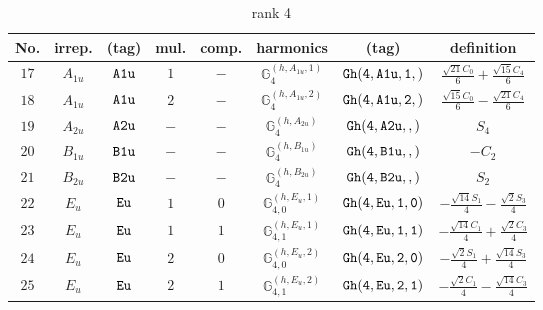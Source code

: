 \documentclass[fleqn,8pt]{jsarticle}
\begin{document}
\begin{table}[ht!]
\begin{center}
\caption{rank 4}
\renewcommand{\arraystretch}{1.3}
\begin{tabular}{cccccccc} \hline \hline
No. & irrep. & (tag) & mul. & comp. & harmonics & (tag) & definition \\ \hline
$ 17 $ & $ A_{1u} $ & $ {\tt A1u} $ & $ 1 $ & $ - $ & $ \mathbb{G}_{4}^{(h,A_{1u},1)} $ & $ {\tt Gh(4,A1u,1,)} $ & $ \frac{\sqrt{21} C_{0}}{6} + \frac{\sqrt{15} C_{4}}{6} $ \\
$ 18 $ & $ A_{1u} $ & $ {\tt A1u} $ & $ 2 $ & $ - $ & $ \mathbb{G}_{4}^{(h,A_{1u},2)} $ & $ {\tt Gh(4,A1u,2,)} $ & $ \frac{\sqrt{15} C_{0}}{6} - \frac{\sqrt{21} C_{4}}{6} $ \\
$ 19 $ & $ A_{2u} $ & $ {\tt A2u} $ & $ - $ & $ - $ & $ \mathbb{G}_{4}^{(h,A_{2u})} $ & $ {\tt Gh(4,A2u,,)} $ & $ S_{4} $ \\
$ 20 $ & $ B_{1u} $ & $ {\tt B1u} $ & $ - $ & $ - $ & $ \mathbb{G}_{4}^{(h,B_{1u})} $ & $ {\tt Gh(4,B1u,,)} $ & $ - C_{2} $ \\
$ 21 $ & $ B_{2u} $ & $ {\tt B2u} $ & $ - $ & $ - $ & $ \mathbb{G}_{4}^{(h,B_{2u})} $ & $ {\tt Gh(4,B2u,,)} $ & $ S_{2} $ \\
$ 22 $ & $ E_{u} $ & $ {\tt Eu} $ & $ 1 $ & $ 0 $ & $ \mathbb{G}_{4,0}^{(h,E_{u},1)} $ & $ {\tt Gh(4,Eu,1,0)} $ & $ - \frac{\sqrt{14} S_{1}}{4} - \frac{\sqrt{2} S_{3}}{4} $ \\
$ 23 $ & $ E_{u} $ & $ {\tt Eu} $ & $ 1 $ & $ 1 $ & $ \mathbb{G}_{4,1}^{(h,E_{u},1)} $ & $ {\tt Gh(4,Eu,1,1)} $ & $ - \frac{\sqrt{14} C_{1}}{4} + \frac{\sqrt{2} C_{3}}{4} $ \\
$ 24 $ & $ E_{u} $ & $ {\tt Eu} $ & $ 2 $ & $ 0 $ & $ \mathbb{G}_{4,0}^{(h,E_{u},2)} $ & $ {\tt Gh(4,Eu,2,0)} $ & $ - \frac{\sqrt{2} S_{1}}{4} + \frac{\sqrt{14} S_{3}}{4} $ \\
$ 25 $ & $ E_{u} $ & $ {\tt Eu} $ & $ 2 $ & $ 1 $ & $ \mathbb{G}_{4,1}^{(h,E_{u},2)} $ & $ {\tt Gh(4,Eu,2,1)} $ & $ - \frac{\sqrt{2} C_{1}}{4} - \frac{\sqrt{14} C_{3}}{4} $ \\
 \hline \hline
\end{tabular}
\end{center}
\end{table}
\end{document}
